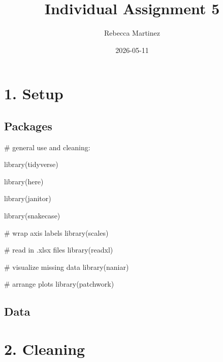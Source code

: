 \documentclass[
  letterpaper,
  DIV=11,
  numbers=noendperiod]{scrartcl}
\title{Individual Assignment 5}
\author{Rebecca Martinez}
\date{2026-05-11}
\newenvironment{Shaded}{\begin{snugshade}}{\end{snugshade}}
\newcommand{\CommentTok}[1]{\textcolor[rgb]{0.37,0.37,0.37}{#1}}
\newcommand{\FunctionTok}[1]{\textcolor[rgb]{0.28,0.35,0.67}{#1}}
\newcommand{\NormalTok}[1]{\textcolor[rgb]{0.00,0.23,0.31}{#1}}
\begin{document}
\maketitle


\section{1. Setup}\label{setup}

\subsection{Packages}\label{packages}

\begin{Shaded}
\begin{Highlighting}[]
\CommentTok{\# general use and cleaning:}

\FunctionTok{library}\NormalTok{(tidyverse)}

\FunctionTok{library}\NormalTok{(here)}

\FunctionTok{library}\NormalTok{(janitor)}

\FunctionTok{library}\NormalTok{(snakecase)}

\CommentTok{\# wrap axis labels}
\FunctionTok{library}\NormalTok{(scales)}

\CommentTok{\# read in .xlsx  files}
\FunctionTok{library}\NormalTok{(readxl)}

\CommentTok{\# visualize missing data}
\FunctionTok{library}\NormalTok{(naniar)}

\CommentTok{\# arrange plots}
\FunctionTok{library}\NormalTok{(patchwork)}
\end{Highlighting}
\end{Shaded}

\subsection{Data}\label{data}

\section{2. Cleaning}\label{cleaning}
\end{document}
